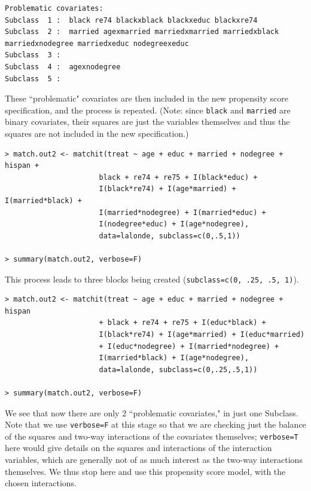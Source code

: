 \documentclass[oneside,letterpaper,titlepage]{article}
\begin{document}
\begin{verbatim}
Problematic covariates:
Subclass  1 :  black re74 blackxblack blackxeduc blackxre74
Subclass  2 :  married agexmarried marriedxmarried marriedxblack marriedxnodegree marriedxeduc nodegreexeduc
Subclass  3 :  
Subclass  4 :  agexnodegree
Subclass  5 :  
\end{verbatim}

These ``problematic" covariates are then included in the new
propensity score specification, and the process is repeated.  (Note:
since {\tt black} and {\tt married} are binary covariates, their
squares are just the variables themselves and thus the squares are not
included in the new specification.)

\begin{verbatim}
> match.out2 <- matchit(treat ~ age + educ + married + nodegree + hispan +
                      black + re74 + re75 + I(black*educ) +
                      I(black*re74) + I(age*married) + I(married*black) + 
                      I(married*nodegree) + I(married*educ) +
                      I(nodegree*educ) + I(age*nodegree),
                      data=lalonde, subclass=c(0,.5,1))

> summary(match.out2, verbose=F)
\end{verbatim}

This process leads to three blocks being created  ({\tt subclass=c(0, .25, .5, 1)}).

\begin{verbatim}
> match.out2 <- matchit(treat ~ age + educ + married + nodegree + hispan
                      + black + re74 + re75 + I(educ*black) +
                      I(black*re74) + I(age*married) + I(educ*married)
                      + I(educ*nodegree) + I(married*nodegree) +
                      I(married*black) + I(age*nodegree),
                      data=lalonde, subclass=c(0,.25,.5,1))

> summary(match.out2, verbose=F)
\end{verbatim}

We see that now there are only 2 ``problematic covariates," in just
one Subclass.  Note that we use {\tt verbose=F} at this stage so that
we are checking just the balance of the squares and two-way
interactions of the covariates themselves; {\tt verbose=T} here would
give details on the squares and interactions of the interaction
variables, which are generally not of as much interest as the two-way
interactions themselves.  We thus stop here and use this propensity
score model, with the chosen interactions.
\end{document}
